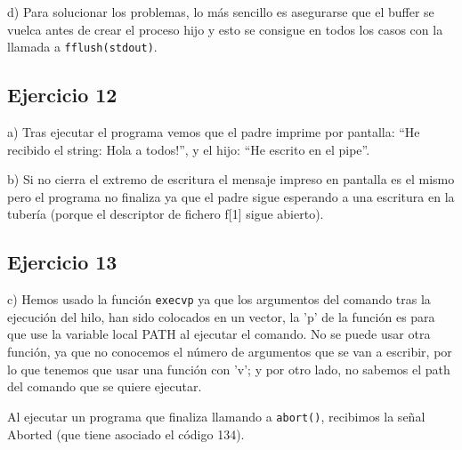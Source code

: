 \documentclass{article}
\begin{document}
d) Para solucionar los problemas, lo más sencillo es asegurarse que el buffer se vuelca antes de crear el proceso hijo y esto se consigue en todos los casos con la llamada a \texttt{fflush(stdout)}.

\subsection*{Ejercicio 12}

a) Tras ejecutar el programa vemos que el padre imprime por pantalla: ``He recibido el string: Hola a todos!'', y el hijo: ``He escrito en el pipe''.

b) Si no cierra el extremo de escritura el mensaje impreso en pantalla es el mismo pero el programa no finaliza ya que el padre sigue esperando a una escritura en la tubería (porque el descriptor de fichero f[1] sigue abierto).

\subsection*{Ejercicio 13}

c) Hemos usado la función \texttt{execvp} ya que los argumentos del comando tras la ejecución del hilo, han sido colocados en un vector, la 'p' de la función es para que use la variable local PATH al ejecutar el comando. No se puede usar otra función, ya que no conocemos el número de argumentos que se van a escribir, por lo que tenemos que usar una función con 'v'; y por otro lado, no sabemos el path del comando que se quiere ejecutar.

Al ejecutar un programa que finaliza llamando a \texttt{abort()}, recibimos la señal Aborted (que tiene asociado el código 134).
\end{document}
